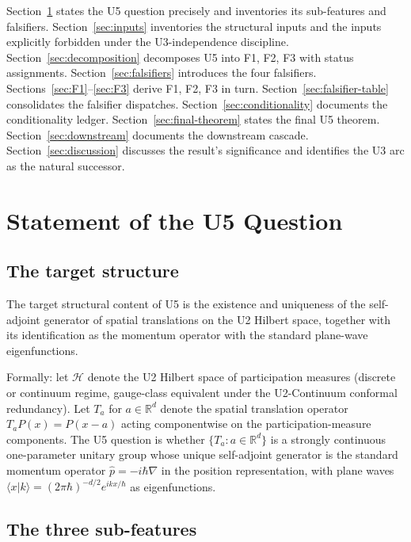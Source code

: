 \documentclass[11pt,a4paper]{article}
\begin{document}
Section~\ref{sec:question} states the U5 question precisely and inventories its sub-features and falsifiers. Section~\ref{sec:inputs} inventories the structural inputs and the inputs explicitly forbidden under the U3-independence discipline. Section~\ref{sec:decomposition} decomposes U5 into F1, F2, F3 with status assignments. Section~\ref{sec:falsifiers} introduces the four falsifiers. Sections~\ref{sec:F1}--\ref{sec:F3} derive F1, F2, F3 in turn. Section~\ref{sec:falsifier-table} consolidates the falsifier dispatches. Section~\ref{sec:conditionality} documents the conditionality ledger. Section~\ref{sec:final-theorem} states the final U5 theorem. Section~\ref{sec:downstream} documents the downstream cascade. Section~\ref{sec:discussion} discusses the result's significance and identifies the U3 arc as the natural successor.

\section{Statement of the U5 Question}\label{sec:question}

\subsection{The target structure}

The target structural content of U5 is the existence and uniqueness of the self-adjoint generator of spatial translations on the U2 Hilbert space, together with its identification as the momentum operator with the standard plane-wave eigenfunctions.

Formally: let $\mathcal{H}$ denote the U2 Hilbert space of participation measures (discrete or continuum regime, gauge-class equivalent under the U2-Continuum conformal redundancy). Let $T_a$ for $a \in \mathbb{R}^d$ denote the spatial translation operator $T_a P(x) = P(x - a)$ acting componentwise on the participation-measure components. The U5 question is whether $\{T_a : a \in \mathbb{R}^d\}$ is a strongly continuous one-parameter unitary group whose unique self-adjoint generator is the standard momentum operator $\hat{p} = -i\hbar\nabla$ in the position representation, with plane waves $\langle x | k \rangle = (2\pi\hbar)^{-d/2} e^{ikx/\hbar}$ as eigenfunctions.

\subsection{The three sub-features}
\end{document}
